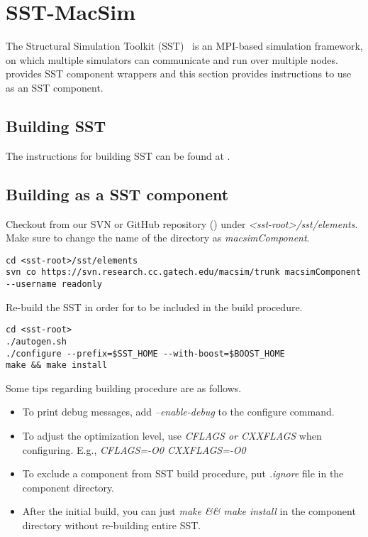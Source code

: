 \section{SST-MacSim}
\label{sec:sst}

The Structural Simulation Toolkit (SST)~\cite{sst} is an MPI-based 
simulation framework, on which multiple simulators can communicate 
and run over multiple nodes. 
\SIM provides SST component wrappers and this section provides 
instructions to use \SIM as an SST component.


\subsection{Building SST}

The instructions for building SST can be found at 
.


\subsection{Building \SIM as a SST component}

Checkout \SIM from our SVN or GitHub repository () under \textit{<sst-root>/sst/elements}.
Make sure to change the name of the directory as \textit{macsimComponent}.

\begin{Verbatim}
cd <sst-root>/sst/elements
svn co https://svn.research.cc.gatech.edu/macsim/trunk macsimComponent
--username readonly 
\end{Verbatim}
Re-build the SST in order for \SIM to be included in the build procedure.

\begin{Verbatim}
cd <sst-root>
./autogen.sh
./configure --prefix=$SST_HOME --with-boost=$BOOST_HOME
make && make install
\end{Verbatim}
Some tips regarding building procedure are as follows.
\begin{itemize}
  \item To print debug messages, add \textit{--enable-debug} to the configure command.
  \item To adjust the optimization level, use \textit{CFLAGS or CXXFLAGS} when configuring. E.g., \textit{CFLAGS=-O0 CXXFLAGS=-O0}
  \item To exclude a component from SST build procedure, put \textit{.ignore} file in the component directory.
  \item After the initial build, you can just \textit{make \&\& make install} in the component directory without re-building entire SST.
\end{itemize}




